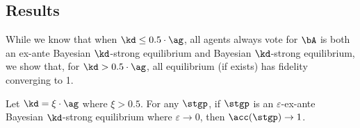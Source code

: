 \subsection{Results}

While we know that when $\kd \le 0.5\cdot \ag$, all agents always vote for $\bA$ is both an ex-ante Bayesian $\kd$-strong equilibrium and Bayesian $\kd$-strong equilibrium, we show that, for $\kd > 0.5\cdot \ag$, all equilibrium (if exists) has fidelity converging to 1. 

\begin{prop}
\label{prop:k>0.5}
    Let $\kd = \xi \cdot \ag$ where $\xi > 0.5$. For any $\stgp$, if $\stgp$ is an $\varepsilon$-ex-ante Bayesian $\kd$-strong equilibrium where $\varepsilon \to 0$, then $\acc(\stgp) \to 1$. 
\end{prop}


